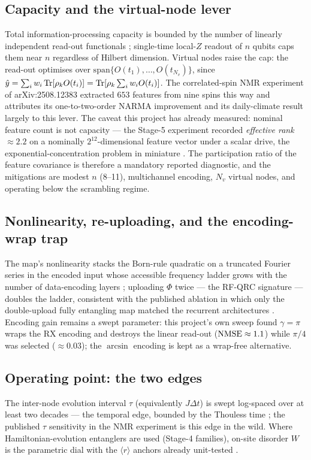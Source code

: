 \subsection{Capacity and the virtual-node lever}
Total information-processing capacity is bounded by the number of linearly
independent read-out functionals \citep{dambre2012information}; single-time
local-$Z$ readout of $n$ qubits caps them near $n$ regardless of Hilbert
dimension. Virtual nodes raise the cap: the read-out optimises over
$\mathrm{span}\{O(t_1),\dots,O(t_{N_v})\}$, since
$\hat y=\sum_i w_i\operatorname{Tr}[\rho_k O(t_i)]=\operatorname{Tr}[\rho_k\sum_i w_i O(t_i)]$. The
correlated-spin NMR experiment of arXiv:2508.12383 extracted $653$ features
from nine spins this way and attributes its one-to-two-order NARMA
improvement and its daily-climate result largely to this lever. The caveat
this project has already measured: nominal feature count is not capacity ---
the Stage-5 experiment recorded \emph{effective rank} $\approx2.2$ on a
nominally $2^{12}$-dimensional feature vector under a scalar drive, the
exponential-concentration problem in miniature
\citep{xiong2025role,sannia2025exponential}. The participation ratio of the
feature covariance is therefore a mandatory reported diagnostic, and the
mitigations are modest $n$ (8--11), multichannel encoding, $N_v$ virtual
nodes, and operating below the scrambling regime.

\subsection{Nonlinearity, re-uploading, and the encoding-wrap trap}
The map's nonlinearity stacks the Born-rule quadratic on a truncated Fourier
series in the encoded input whose accessible frequency ladder grows with the
number of data-encoding layers \citep{schuld2021effect}; uploading $\Phi$
twice --- the RF-QRC signature --- doubles the ladder, consistent with the
published ablation in which only the double-upload fully entangling map
matched the recurrent architectures \citep{ahmed2024prediction}. Encoding
gain remains a swept parameter: this project's own sweep found
$\gamma=\pi$ wraps the RX encoding and destroys the linear read-out
($\mathrm{NMSE}\approx1.1$) while $\pi/4$ was selected ($\approx0.03$); the
$\arcsin$ encoding is kept as a wrap-free alternative.

\subsection{Operating point: the two edges}
The inter-node evolution interval $\tau$ (equivalently $J\Delta t$) is swept
log-spaced over at least two decades --- the temporal edge, bounded by the
Thouless time \citep{kobayashi2026edge}; the published $\tau$ sensitivity in
the NMR experiment is this edge in the wild. Where Hamiltonian-evolution
entanglers are used (Stage-4 families), on-site disorder $W$ is the
parametric dial with the $\langle r\rangle$ anchors already unit-tested
\citep{martinez2021dynamical}.

